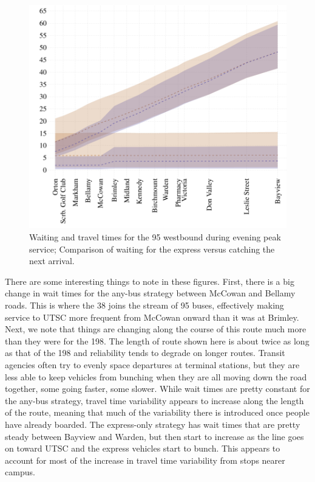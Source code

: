 \documentclass{article}
\begin{document}
		\begin{figure}[h]
			\centering
			\includegraphics{figures/95_west_evening}
			\caption{ Waiting and travel times for the 95 westbound during evening peak service; Comparison of waiting for the express versus catching the next arrival.}
			\label{fig:95_west_even}
		\end{figure}
		
		There are some interesting things to note in these figures. First, there is a big change in wait times for the any-bus strategy between McCowan and Bellamy roads. This is where the 38 joins the stream of 95 buses, effectively making service to UTSC more frequent from McCowan onward than it was at Brimley. Next, we note that things are changing along the course of this route much more than they were for the 198. The length of route shown here is about twice as long as that of the 198 and reliability tends to degrade on longer routes. Transit agencies often try to evenly space departures at terminal stations, but they are less able to keep vehicles from bunching when they are all moving down the road together, some going faster, some slower. 
		While wait times are pretty constant for the any-bus strategy, travel time variability appears to increase along the length of the route, meaning that much of the variability there is introduced once people have already boarded. 
		The express-only strategy has wait times that are pretty steady between Bayview and Warden, but then start to increase as the line goes on toward UTSC and the express vehicles start to bunch. This appears to account for most of the increase in travel time variability from stops nearer campus.
		
\end{document}

